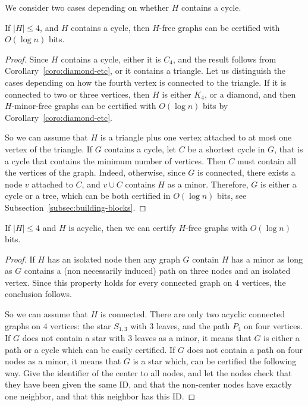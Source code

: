 \documentclass[a4paper,thm-restate,USenglish]{lipics-v2019}
\begin{document}
\ThmFourVertices*

We consider two cases depending on whether $H$ contains a cycle. 

\begin{lemma}
If $|H| \le 4$, and $H$ contains a cycle, then $H$-free graphs can be certified with $O(\log n)$ bits.
\end{lemma}

\begin{proof}
Since $H$ contains a cycle, either it is $C_4$, and the result follows from Corollary~\ref{coro:diamond-etc}, or it contains a triangle. 
Let us distinguish the cases depending on how the fourth vertex is connected to the triangle. If it is connected to two or three vertices, then $H$ is either $K_4$, or a diamond, and then $H$-minor-free graphs can be certified with $O(\log n)$ bits by Corollary~\ref{coro:diamond-etc}.

So we can assume that $H$ is a triangle plus one vertex attached to at most one vertex of the triangle. If $G$ contains a cycle, let $C$ be a shortest cycle in $G$, that is a cycle that contains the minimum number of vertices. Then $C$ must contain all the vertices of the graph. Indeed, otherwise, since $G$ is connected, there exists a node $v$ attached to $C$, and $v \cup C$ contains $H$ as a minor. Therefore, $G$ is either a cycle or a tree, which can be both certified in $O(\log n)$ bits, see Subsection~\ref{subsec:building-blocks}.
\end{proof}

\begin{lemma}
If $|H|\le 4$ and $H$ is acyclic, then we can certify $H$-free graphs with $O(\log n)$ bits.
\end{lemma}
\begin{proof}
If $H$ has an isolated node then any graph $G$ contain $H$ has a minor as long as $G$ contains a (non necessarily induced) path on three nodes and an isolated vertex. Since this property holds for every connected graph on $4$ vertices, the conclusion follows.

So we can assume that $H$ is connected. There are only two acyclic connected graphs on $4$ vertices: the star $S_{1,3}$ with $3$ leaves, and the path $P_4$ on four vertices.
If $G$ does not contain a star with $3$ leaves as a minor, it means that $G$ is either a path or a cycle which can be easily certified. 
If $G$ does not contain a path on four nodes as a minor, it means that $G$ is a star which, can be certified the following way. Give the identifier of the center to all nodes, and let the nodes check that they have been given the same ID, and that the non-center nodes have exactly one neighbor, and that this neighbor has this ID.
\end{proof}
\end{document}
